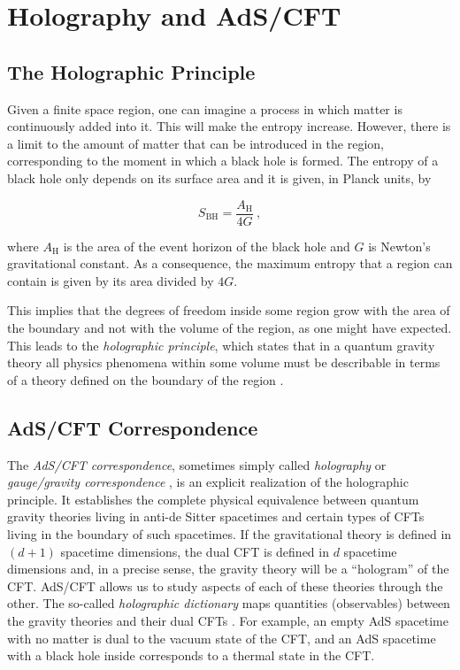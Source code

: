 \documentclass[twocolumn]{revtex4}
\providecommand{\eq}[2]{
    \begin{equation}
        #2
    \label{eq:#1}
    \end{equation}
}
\begin{document}
\section{Holography and AdS/CFT} \label{s:Holo_AdS/CFT}


\subsection{The Holographic Principle} \label{ss:Holography}

Given a finite space region, one can imagine a process in which matter is continuously added into it. This will make the entropy increase. However, there is a limit to the amount of matter that can be introduced in the region, corresponding to the moment in which a black hole is formed. The entropy of a black hole only depends on its surface area and it is given, in Planck units, by \cite{bekenstein_black_1973, hawking_particle_1975}
\eq{BH}{
    S_\text{BH} = \frac{ A_\text{H} }{ 4 G } \ ,
}
where $A_\text{H}$ is the area of the event horizon of the black hole and $G$ is Newton's gravitational constant. As a consequence, the maximum entropy that a region can contain is given by its area divided by $4G$.

This implies that the degrees of freedom inside some region grow with the area of the boundary and not with the volume of the region, as one might have expected. This leads to the \emph{holographic principle}, which states that in a quantum gravity theory all physics phenomena within some volume must be describable in terms of a theory defined on the boundary of the region \cite{t_hooft_dimensional_2009}.


\subsection{AdS/CFT Correspondence} \label{ss:AdS/CFT}

The \emph{AdS/CFT correspondence}, sometimes simply called \emph{holography} or \emph{gauge/gravity correspondence} \cite{maldacena_large_1999}, is an explicit realization of the holographic principle. It establishes the complete physical equivalence between quantum gravity theories living in anti-de Sitter spacetimes and certain types of CFTs living in the boundary of such spacetimes. If the gravitational theory is defined in $(d+1)$ spacetime dimensions, the dual CFT is defined in $d$ spacetime dimensions and, in a precise sense, the gravity theory will be a ``hologram'' of the CFT. AdS/CFT allows us to study aspects of each of these theories through the other. The so-called \emph{holographic dictionary} maps quantities (observables) between the gravity theories and their dual CFTs \cite{witten_anti_1998}. For example, an empty AdS spacetime with no matter is dual to the vacuum state of the CFT, and an AdS spacetime with a black hole inside corresponds to a thermal state in the CFT.
\end{document}
